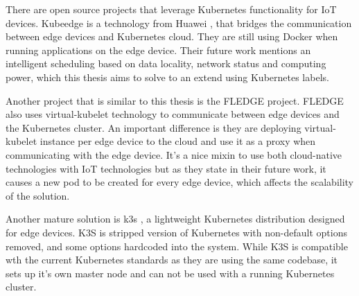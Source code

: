 There are open source projects that leverage Kubernetes functionality for IoT devices. Kubeedge \cite{kubeedge} is a technology from Huawei , that bridges the communication between edge devices and Kubernetes cloud. They are still using Docker when running applications on the edge device. Their future work mentions an intelligent scheduling based on data locality, network status and computing power, which this thesis aims to solve to an extend using Kubernetes labels.

Another project that is similar to this thesis is the FLEDGE project\cite{fledge}. FLEDGE also uses virtual-kubelet technology to communicate between edge devices and the Kubernetes cluster. An important difference is they are deploying virtual-kubelet instance per edge device to the cloud and use it as a proxy when communicating with the edge device. It's a nice mixin to use both cloud-native technologies with IoT technologies but as they state in their future work, it causes a new pod to be created for every edge device, which affects the scalability of the solution.

Another mature solution is k3s \cite{k3s}, a lightweight Kubernetes distribution designed for edge devices. K3S is stripped version of Kubernetes with non-default options removed, and some options hardcoded into the system. While K3S is compatible wth the current Kubernetes standards as they are using the same codebase, it sets up it's own master node and can not be used with a running Kubernetes cluster.



\fi